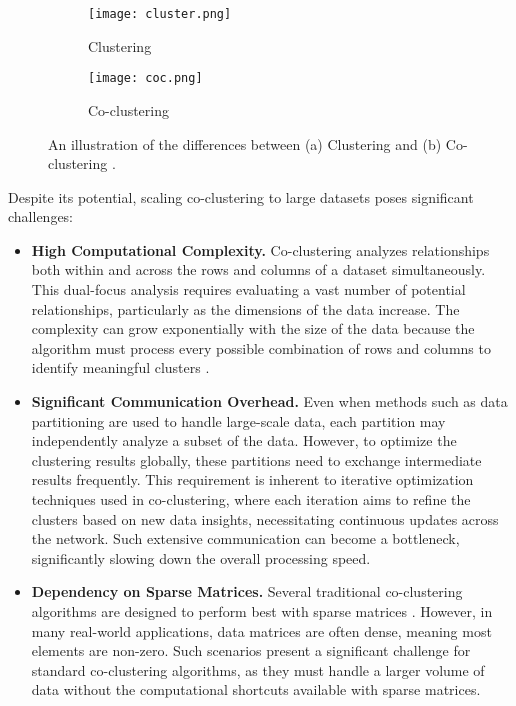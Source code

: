 \begin{figure}[htbp]
    \centering
    \begin{subfigure}[b]{0.22\textwidth}
        \texttt{[image: cluster.png]}
        \caption{Clustering}
        \label{fig:cluster}
    \end{subfigure}
    \hfill
    \begin{subfigure}[b]{0.22\textwidth}
        \texttt{[image: coc.png]}
        \caption{Co-clustering}
        \label{fig:cocluster}
    \end{subfigure}
    \caption{An illustration of the differences between (a) Clustering and (b) Co-clustering \cite{yan2017CoclusteringMultidimensionalBig}.}
    \label{fig:cocomparison}
\end{figure}

Despite its potential, scaling co-clustering to large datasets poses significant challenges:

\begin{itemize}
    \item{\textbf{High Computational Complexity.}} Co-clustering analyzes relationships both within and across the rows and columns of a dataset simultaneously. This dual-focus analysis requires evaluating a vast number of potential relationships, particularly as the dimensions of the data increase. The complexity can grow exponentially with the size of the data because the algorithm must process every possible combination of rows and columns to identify meaningful clusters \cite{hansen2011NonparametricCoclusteringLarge}.
    \item{\textbf{Significant Communication Overhead.}} Even when methods such as data partitioning are used to handle large-scale data, each partition may independently analyze a subset of the data. However, to optimize the clustering results globally, these partitions need to exchange intermediate results frequently. This requirement is inherent to iterative optimization techniques used in co-clustering, where each iteration aims to refine the clusters based on new data insights, necessitating continuous updates across the network. Such extensive communication can become a bottleneck, significantly slowing down the overall processing speed.
    \item{\textbf{Dependency on Sparse Matrices.}} Several traditional co-clustering algorithms are designed to perform best with sparse matrices \cite{pan2008CRDFastCoclusteringa}. However, in many real-world applications, data matrices are often dense, meaning most elements are non-zero. Such scenarios present a significant challenge for standard co-clustering algorithms, as they must handle a larger volume of data without the computational shortcuts available with sparse matrices.
\end{itemize}

